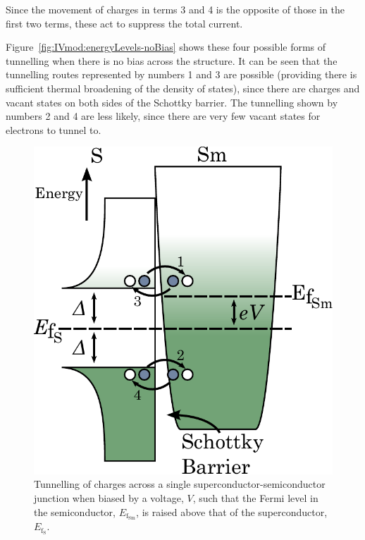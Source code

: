 Since the movement of charges in terms 3 and 4 is the opposite of those in the first two terms, these act to suppress the total current.
\par
Figure~\ref{fig:IVmod:energyLevels-noBias} shows these four possible forms of tunnelling when there is no bias across the structure. It can be seen that the tunnelling routes represented by numbers 1 and 3 are possible (providing there is sufficient thermal broadening of the density of states), since there are charges and vacant states on both sides of the Schottky barrier. The tunnelling shown by numbers 2 and 4 are less likely, since there are very few vacant states for electrons to tunnel to.
\begin{figure}[t]
\begin{center}
\includegraphics[height = 0.5\textheight]{figures/CEB_energyLevels_+veBias}
\caption[Tunnelling in of charges across a positively biased device]{Tunnelling of charges across a single superconductor-semiconductor junction when biased by a voltage, $V$, such that the Fermi level in the semiconductor, $E_{\mathrm{f_{Sm}}}$, is raised above that of the superconductor, $E_\mathrm{{f_{S}}}$.}
\label{fig:IVmod:energyLevels-+Bias}
\end{center}
\end{figure}
